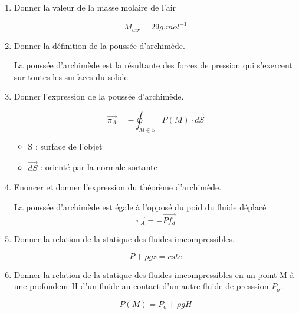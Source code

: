 \documentclass{article}
\begin{document}
\begin{enumerate}[label=\arabic{enumi} - , left=0pt, itemsep=1em]
\begin{solution}
           \end{solution}
     
     \item Donner la valeur de la masse molaire de l'air\par
           \begin{solution}
               \[ M_{air} = 29 g.mol^{-1} \]
       
           \end{solution}
     
    \item Donner la définition de la poussée d'archimède. \par
    \begin{solution}
        La poussée d'archimède est la résultante des forces de pression qui s'exercent sur toutes les surfaces du solide 
     \end{solution}

     \item Donner l'expression de la poussée d'archimède. \par
     \begin{solution}
         \[ \vec{\pi_A} = -\oint_{M \in S} P(M) \cdot \vec{dS} \]
         \begin{itemize}
          \tiny\item   S : surface de l'objet
          \tiny\item   $\vec{dS}$ : orienté par la normale sortante
      \end{itemize}  
      \end{solution}

      \item Enoncer et donner l'expression du théorème d'archimède. \par
      \begin{solution}
          La poussée d'archimède est égale à l'opposé du poid du fluide déplacé
          \[\vec{\pi_A} = - \overrightarrow{Pf_d} \] 
       \end{solution}

       \item Donner la relation de la statique des fluides imcompressibles. \par
       \begin{solution}
          \[ P + \rho g z = cste\]
        \end{solution}

        \item Donner la relation de la statique des fluides imcompressibles en un point M à une profondeur H d'un fluide au contact d'un autre fluide de presssion $P_o$. \par
        \begin{solution}
           \[P(M) = P_o + \rho g H\]
           

\end{solution}
\end{enumerate}
\end{document}
